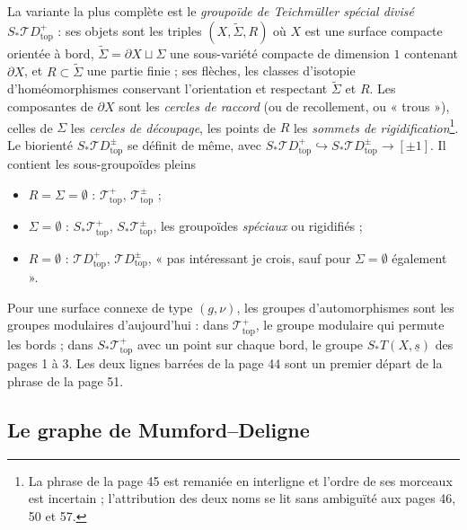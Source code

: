 \documentclass[11pt,a4paper]{article}
\begin{document}
La variante la plus complète est le \emph{groupoïde de Teichmüller spécial
divisé} $S_{*}\mathcal{T}D^{+}_{\mathrm{top}}$ : ses objets sont les triples
$(X, \widetilde{\Sigma}, R)$ où $X$ est une surface compacte orientée à bord,
$\widetilde{\Sigma} = \partial X \sqcup \Sigma$ une sous-variété compacte de
dimension $1$ contenant $\partial X$, et $R \subset \widetilde{\Sigma}$ une
partie finie ; ses flèches, les classes d'isotopie d'homéomorphismes conservant
l'orientation et respectant $\widetilde{\Sigma}$ et $R$. Les composantes de
$\partial X$ sont les \emph{cercles de raccord} (ou de recollement, ou « trous
»), celles de $\Sigma$ les \emph{cercles de découpage}, les points de $R$ les
\emph{sommets de rigidification}\footnote{La phrase de la page 45 est remaniée en
interligne et l'ordre de ses morceaux est incertain ; l'attribution des deux
noms se lit sans ambiguïté aux pages 46, 50 et 57.}. Le biorienté
$S_{*}\mathcal{T}D^{\pm}_{\mathrm{top}}$ se définit de même, avec $S_{*}\mathcal{T}
D^{+}_{\mathrm{top}} \hookrightarrow S_{*}\mathcal{T}D^{\pm}_{\mathrm{top}} \to
[\pm 1]$. Il contient les sous-groupoïdes pleins
\begin{itemize}
\item $R = \Sigma = \emptyset$ : $\mathcal{T}^{+}_{\mathrm{top}}$,
$\mathcal{T}^{\pm}_{\mathrm{top}}$ ;
\item $\Sigma = \emptyset$ : $S_{*}\mathcal{T}^{+}_{\mathrm{top}}$,
$S_{*}\mathcal{T}^{\pm}_{\mathrm{top}}$, les groupoïdes \emph{spéciaux} ou
rigidifiés ;
\item $R = \emptyset$ : $\mathcal{T}D^{+}_{\mathrm{top}}$,
$\mathcal{T}D^{\pm}_{\mathrm{top}}$, « pas intéressant je crois, sauf pour
$\Sigma = \emptyset$ également ».
\end{itemize}
Pour une surface connexe de type $(g, \nu)$, les groupes d'automorphismes sont
les groupes modulaires d'aujourd'hui : dans $\mathcal{T}^{+}_{\mathrm{top}}$, le
groupe modulaire qui permute les bords ; dans $S_{*}\mathcal{T}^{+}_{\mathrm{top}}$
avec un point sur chaque bord, le groupe $S_{*}T(X, \underline{s})$ des pages 1
à 3. Les deux lignes barrées de la page 44 sont un premier départ de la phrase
de la page 51.

\subsection*{Le graphe de Mumford--Deligne}
\end{document}
